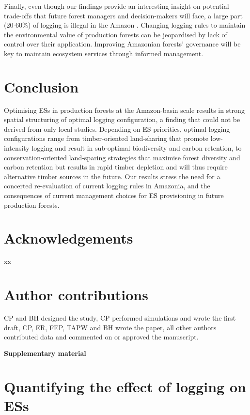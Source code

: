 \documentclass{article}
\newcommand{\beginsupplement}{%
        \setcounter{table}{0}
        \renewcommand{\thetable}{S\arabic{table}}%
        \setcounter{figure}{0}
        \renewcommand{\thefigure}{S\arabic{figure}}%
     }
\begin{document}
Finally, even though our findings provide an interesting insight on potential trade-offs that future forest managers and decision-makers will face, a large part (20-60\%) of logging is illegal in the Amazon \cite{Brancalion2018,Finer2014}. Changing logging rules to maintain the environmental value of production forests can be jeopardised by lack of control over their application. Improving Amazonian forests' governance will be key to maintain ecosystem services through informed management. 

\section{Conclusion}
Optimising ESs in production forests at the Amazon-basin scale results in strong spatial structuring of optimal logging configuration, a finding that could not be derived from only local studies. Depending on ES priorities, optimal logging configurations range from timber-oriented land-sharing that promote low-intensity logging and result in sub-optimal biodiversity and carbon retention, to conservation-oriented land-sparing strategies that maximise forest diversity and carbon retention but results in rapid timber depletion and will thus require alternative timber sources in the future. Our results stress the need for a concerted re-evaluation of current logging rules in Amazonia, and the consequences of current management choices for ES provisioning in future production forests.


\section{Acknowledgements}
xx

\section{Author contributions}
CP and BH designed the study, CP performed simulations and wrote the first draft, CP, ER, FEP, TAPW and BH wrote the paper, all other authors contributed data and commented on or approved the manuscript.


\clearpage





\onecolumn
\beginsupplement
\appendix
\begin{center}
    { \huge \textbf{Supplementary material}}
\end{center} 

\section{Quantifying the effect of logging on ESs}
\label{sec:ESestimation}
\end{document}
